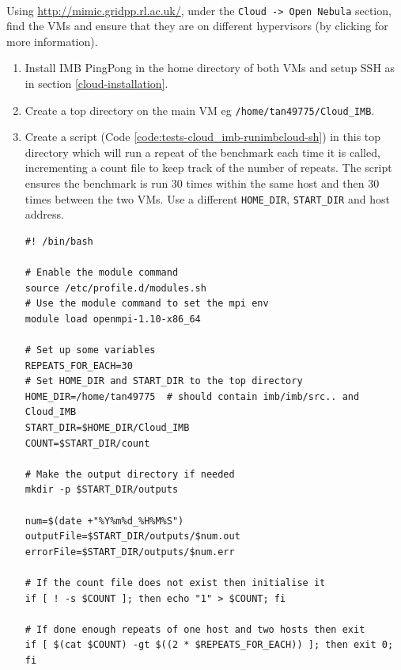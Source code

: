 \documentclass{article}
\newenvironment{code}{\captionsetup{type=listing}}{}
\begin{document}
            \paragraph{}
            Using \url{http://mimic.gridpp.rl.ac.uk/}, under the \verb|Cloud -> Open Nebula| section, find the VMs and ensure that they are on different hypervisors (by clicking for more information).

            \begin{enumerate}
                \item Install IMB PingPong in the home directory of both VMs and setup SSH as in section \ref{cloud-installation}.
                \item Create a top directory on the main VM eg \verb|/home/tan49775/Cloud_IMB|.
                \item Create a script (Code \ref{code:tests-cloud_imb-runimbcloud-sh}) in this top directory which will run a repeat of the benchmark each time it is called, incrementing a count file to keep track of the number of repeats. The script ensures the benchmark is run 30 times within the same host and then 30 times between the two VMs. Use a different \verb|HOME_DIR|, \verb|START_DIR| and host address.
                    \begin{code}
                    \label{code:tests-cloud_imb-runimbcloud-sh}
                    \begin{verbatim}
#! /bin/bash

# Enable the module command
source /etc/profile.d/modules.sh
# Use the module command to set the mpi env
module load openmpi-1.10-x86_64

# Set up some variables
REPEATS_FOR_EACH=30
# Set HOME_DIR and START_DIR to the top directory
HOME_DIR=/home/tan49775  # should contain imb/imb/src.. and Cloud_IMB
START_DIR=$HOME_DIR/Cloud_IMB
COUNT=$START_DIR/count

# Make the output directory if needed
mkdir -p $START_DIR/outputs

num=$(date +"%Y%m%d_%H%M%S")
outputFile=$START_DIR/outputs/$num.out
errorFile=$START_DIR/outputs/$num.err

# If the count file does not exist then initialise it
if [ ! -s $COUNT ]; then echo "1" > $COUNT; fi

# If done enough repeats of one host and two hosts then exit
if [ $(cat $COUNT) -gt $((2 * $REPEATS_FOR_EACH)) ]; then exit 0; fi


\end{verbatim}
\end{code}
\end{enumerate}
\end{document}
